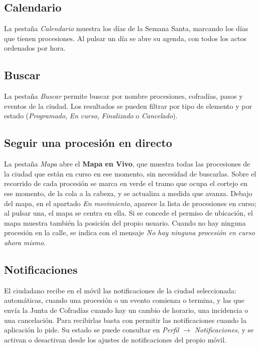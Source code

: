 \subsection{Calendario}

La pestaña \emph{Calendario} muestra los días de la Semana Santa, marcando los días que tienen procesiones. Al pulsar un día se abre su agenda, con todos los actos ordenados por hora.

\subsection{Buscar}

La pestaña \emph{Buscar} permite buscar por nombre procesiones, cofradías, pasos y eventos de la ciudad. Los resultados se pueden filtrar por tipo de elemento y por estado (\emph{Programado}, \emph{En curso}, \emph{Finalizado} o \emph{Cancelado}).

\subsection{Seguir una procesión en directo}

La pestaña \emph{Mapa} abre el \textbf{Mapa en Vivo}, que muestra todas las procesiones de la ciudad que están en curso en ese momento, sin necesidad de buscarlas. Sobre el recorrido de cada procesión se marca en verde el tramo que ocupa el cortejo en ese momento, de la cola a la cabeza, y se actualiza a medida que avanza. Debajo del mapa, en el apartado \emph{En movimiento}, aparece la lista de procesiones en curso; al pulsar una, el mapa se centra en ella. Si se concede el permiso de ubicación, el mapa muestra también la posición del propio usuario. Cuando no hay ninguna procesión en la calle, se indica con el mensaje \emph{No hay ninguna procesión en curso ahora mismo}.

\subsection{Notificaciones}

El ciudadano recibe en el móvil las notificaciones de la ciudad seleccionada: automáticas, cuando una procesión o un evento comienza o termina, y las que envía la Junta de Cofradías cuando hay un cambio de horario, una incidencia o una cancelación. Para recibirlas basta con permitir las notificaciones cuando la aplicación lo pide. Su estado se puede consultar en \emph{Perfil} $\rightarrow$ \emph{Notificaciones}, y se activan o desactivan desde los ajustes de notificaciones del propio móvil.


